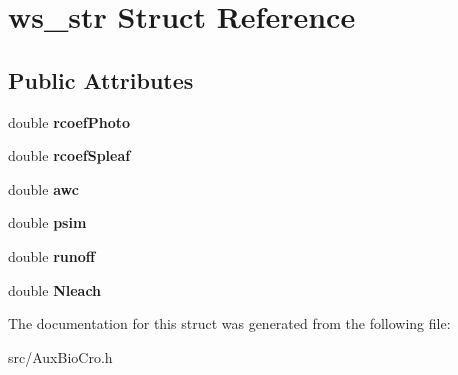 \hypertarget{structws__str}{\section{ws\-\_\-str Struct Reference}
\label{structws__str}
}
\subsection*{Public Attributes}
\begin{DoxyCompactItemize}
\item 
\hypertarget{structws__str_afc72cd4863bbd3c28c97bcdb112f6d7e}{double {\bfseries rcoef\-Photo}}\label{structws__str_afc72cd4863bbd3c28c97bcdb112f6d7e}

\item 
\hypertarget{structws__str_ad1edd59166e36327c9b76fde576162b3}{double {\bfseries rcoef\-Spleaf}}\label{structws__str_ad1edd59166e36327c9b76fde576162b3}

\item 
\hypertarget{structws__str_aa26f0c560619be1db558875f15fc7419}{double {\bfseries awc}}\label{structws__str_aa26f0c560619be1db558875f15fc7419}

\item 
\hypertarget{structws__str_a0ca074c3b977c89e64289641c5056021}{double {\bfseries psim}}\label{structws__str_a0ca074c3b977c89e64289641c5056021}

\item 
\hypertarget{structws__str_a7160f2549e1fd6eb443f25f735f266ce}{double {\bfseries runoff}}\label{structws__str_a7160f2549e1fd6eb443f25f735f266ce}

\item 
\hypertarget{structws__str_adb12cb7c4d83c85849de127132bca5d1}{double {\bfseries Nleach}}\label{structws__str_adb12cb7c4d83c85849de127132bca5d1}

\end{DoxyCompactItemize}


The documentation for this struct was generated from the following file\-:\begin{DoxyCompactItemize}
\item 
src/Aux\-Bio\-Cro.\-h\end{DoxyCompactItemize}

